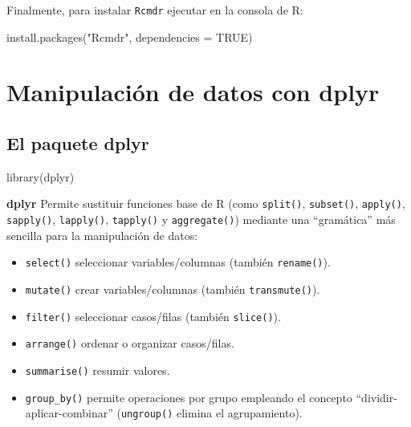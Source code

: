 \documentclass[
]{book}
\newenvironment{Shaded}{\begin{snugshade}}{\end{snugshade}}
\newcommand{\AttributeTok}[1]{\textcolor[rgb]{0.77,0.63,0.00}{#1}}
\newcommand{\ConstantTok}[1]{\textcolor[rgb]{0.00,0.00,0.00}{#1}}
\newcommand{\FunctionTok}[1]{\textcolor[rgb]{0.00,0.00,0.00}{#1}}
\newcommand{\NormalTok}[1]{#1}
\newcommand{\StringTok}[1]{\textcolor[rgb]{0.31,0.60,0.02}{#1}}
\providecommand{\tightlist}{%
  \setlength{\itemsep}{0pt}\setlength{\parskip}{0pt}}
\theoremstyle{break}
\theoremstyle{nonumberplain}
\begin{document}
Finalmente, para instalar \texttt{Rcmdr} ejecutar en la consola de R:

\begin{Shaded}
\begin{Highlighting}[]
\FunctionTok{install.packages}\NormalTok{(}\StringTok{"Rcmdr"}\NormalTok{, }\AttributeTok{dependencies =} \ConstantTok{TRUE}\NormalTok{)}
\end{Highlighting}
\end{Shaded}

\hypertarget{manipulaciuxf3n-de-datos-con-dplyr}{%
\chapter{Manipulación de datos con dplyr}\label{manipulaciuxf3n-de-datos-con-dplyr}}

\hypertarget{el-paquete-dplyr}{%
\section{\texorpdfstring{El paquete \textbf{dplyr}}{El paquete dplyr}}\label{el-paquete-dplyr}}

\begin{Shaded}
\begin{Highlighting}[]
\FunctionTok{library}\NormalTok{(dplyr)}
\end{Highlighting}
\end{Shaded}

\textbf{dplyr} Permite sustituir funciones base de R (como \texttt{split()}, \texttt{subset()},
\texttt{apply()}, \texttt{sapply()}, \texttt{lapply()}, \texttt{tapply()} y \texttt{aggregate()})
mediante una ``gramática'' más sencilla para la manipulación de datos:

\begin{itemize}
\tightlist
\item
  \texttt{select()} seleccionar variables/columnas (también \texttt{rename()}).
\item
  \texttt{mutate()} crear variables/columnas (también \texttt{transmute()}).
\item
  \texttt{filter()} seleccionar casos/filas (también \texttt{slice()}).
\item
  \texttt{arrange()} ordenar o organizar casos/filas.
\item
  \texttt{summarise()} resumir valores.
\item
  \texttt{group\_by()} permite operaciones por grupo empleando el concepto
  ``dividir-aplicar-combinar'' (\texttt{ungroup()} elimina el agrupamiento).
\end{itemize}
\end{document}
